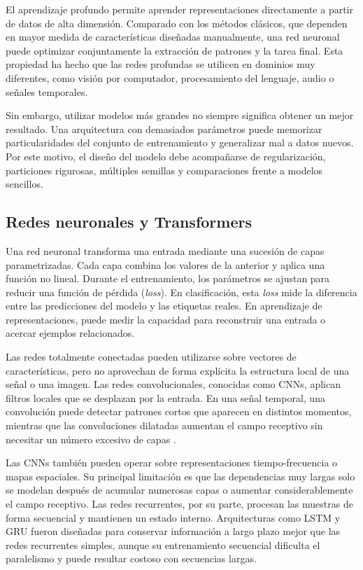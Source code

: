 El aprendizaje profundo permite aprender representaciones directamente a partir de datos de alta dimensión. Comparado con los métodos clásicos, que dependen en mayor medida de características diseñadas manualmente, una red neuronal puede optimizar conjuntamente la extracción de patrones y la tarea final. Esta propiedad ha hecho que las redes profundas se utilicen en dominios muy diferentes, como visión por computador, procesamiento del lenguaje, audio o señales temporales.

Sin embargo, utilizar modelos más grandes no siempre significa obtener un mejor resultado. Una arquitectura con demasiados parámetros puede memorizar particularidades del conjunto de entrenamiento y generalizar mal a datos nuevos. Por este motivo, el diseño del modelo debe acompañarse de regularización, particiones rigurosas, múltiples semillas y comparaciones frente a modelos sencillos.

\subsection{Redes neuronales y Transformers}

Una red neuronal transforma una entrada mediante una sucesión de capas parametrizadas. Cada capa combina los valores de la anterior y aplica una función no lineal. Durante el entrenamiento, los parámetros se ajustan para reducir una función de pérdida (\textit{loss}). En clasificación, esta \textit{loss} mide la diferencia entre las predicciones del modelo y las etiquetas reales. En aprendizaje de representaciones, puede medir la capacidad para reconstruir una entrada o acercar ejemplos relacionados.

Las redes totalmente conectadas pueden utilizarse sobre vectores de características, pero no aprovechan de forma explícita la estructura local de una señal o una imagen. Las redes convolucionales, conocidas como CNNs, aplican filtros locales que se desplazan por la entrada. En una señal temporal, una convolución puede detectar patrones cortos que aparecen en distintos momentos, mientras que las convoluciones dilatadas aumentan el campo receptivo sin necesitar un número excesivo de capas \cite{defossez2023speech,dascoli2024words}.

Las CNNs también pueden operar sobre representaciones tiempo-frecuencia o mapas espaciales. Su principal limitación es que las dependencias muy largas solo se modelan después de acumular numerosas capas o aumentar considerablemente el campo receptivo. Las redes recurrentes, por su parte, procesan las muestras de forma secuencial y mantienen un estado interno. Arquitecturas como LSTM y GRU fueron diseñadas para conservar información a largo plazo mejor que las redes recurrentes simples, aunque su entrenamiento secuencial dificulta el paralelismo y puede resultar costoso con secuencias largas.

